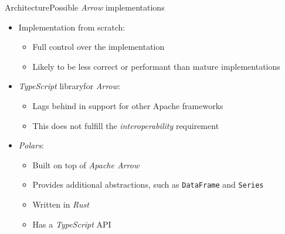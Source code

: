 \begin{frame}[t]{Architecture}{Possible \emph{Arrow} implementations}
	\begin{itemize}
		\item<1-> Implementation from scratch:
		      \begin{itemize}
			      \item Full control over the implementation
			      \item Likely to be less correct or performant than mature implementations
		      \end{itemize}
		\item<2-> \emph{TypeScript} library\footnotemark[1] for \emph{Arrow}:
		      \begin{itemize}
			      \item Lags behind in support for other Apache frameworks\footnotemark[2]
			      \item This does not fulfill the \emph{interoperability} requirement
		      \end{itemize}
		\item<3-> \emph{Polars}\footnotemark[3]:
		      \begin{itemize}
			      \item Built on top of \emph{Apache Arrow}
			      \item Provides additional abstractions, such as \Verb|DataFrame| and \Verb|Series|
			      \item Written in \emph{Rust}
			      \item Has a \emph{TypeScript} API
		      \end{itemize}
	\end{itemize}

\end{frame}

